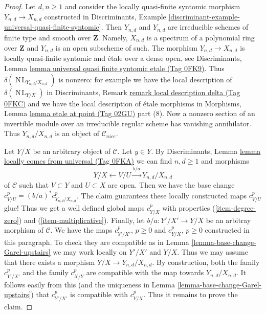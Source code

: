 \documentclass{amsart}
\theoremstyle{plain}
\theoremstyle{definition}
\theoremstyle{remark}
\numberwithin{equation}{subsection}
\def\NL{\mathop{N\!L}\nolimits}
\begin{document}
\begin{proof}
\medskip\noindent
Let $d, n \geq 1$ and consider the locally
quasi-finite syntomic morphism $Y_{n, d} \to X_{n, d}$
constructed in Discriminants, Example
\ref{discriminant-example-universal-quasi-finite-syntomic}.
Then $Y_{n, d}$ and $Y_{n, d}$ are irreducible schemes of finite type and
smooth over $\mathbf{Z}$. Namely, $X_{n, d}$ is a spectrum of a
polynomial ring over $\mathbf{Z}$ and $Y_{n, d}$ is an open subscheme
of such. The morphism $Y_{n, d} \to X_{n, d}$ is locally quasi-finite syntomic
and \'etale over a dense open, see Discriminants, Lemma
\href{https://stacks.math.columbia.edu/tag/0FK9}{lemma universal quasi finite syntomic etale (Tag 0FK9)}.
Thus $\delta(\NL_{Y_{n, d}/X_{n, d}})$ is nonzero: for example we have
the local description of $\delta(\NL_{Y/X})$ in
Discriminants, Remark \href{https://stacks.math.columbia.edu/tag/0FKC}{remark local description delta (Tag 0FKC)}
and we have the local description of \'etale morphisms in
Morphisms, Lemma \href{https://stacks.math.columbia.edu/tag/02GU}{lemma etale at point (Tag 02GU)} part (8).
Now a nonzero section of an invertible module over an irreducible
regular scheme has vanishing annihilator. Thus
$Y_{n, d}/X_{n, d}$ is an object of $\mathcal{C}_{nice}$.

\medskip\noindent
Let $Y/X$ be an arbitrary object of $\mathcal{C}$. Let $y \in Y$.
By Discriminants, Lemma \href{https://stacks.math.columbia.edu/tag/0FKA}{lemma locally comes from universal (Tag 0FKA)}
we can find $n, d \geq 1$ and morphisms
$$
Y/X \leftarrow V/U \xrightarrow{b/a} Y_{n, d}/X_{n, d}
$$
of $\mathcal{C}$ such that $V \subset Y$ and $U \subset X$ are open.
Then we have the base change $c^p_{V/U} = (b/a)^*c^p_{Y_{n, d}/X_{n, d}}$.
The claim guarantees these locally constructed maps $c^p_{V/U}$ glue!
Thus we get a well defined global maps $c^p_{Y/X}$ with properties
(\ref{item-degree-zero}) and (\ref{item-multiplicative}).
Finally, let $b/a : Y'/X' \to Y/X$ be an arbitray morphism of $\mathcal{C}$.
We have the maps $c^p_{Y'/X'}$, $p \geq 0$ and $c^p_{Y/X}$, $p \geq 0$
constructed in this paragraph. To check they are compatible as in
Lemma \ref{lemma-base-change-Garel-upstairs} we may work locally
on $Y'/X'$ and $Y/X$. Thus we may assume that there exists a morphism
$Y/X \to Y_{n, d}/X_{n, d}$. By construction, both the family
$c^p_{Y'/X'}$ and the family $c^p_{X/Y}$ are compatible with
the map towards $Y_{n, d}/X_{n, d}$. It follows easily from this
(and the uniqueness in Lemma \ref{lemma-base-change-Garel-upstairs})
that $c^p_{Y'/X'}$ is compatible with $c^p_{Y/X}$.
Thus it remains to prove the claim.


\end{proof}
\end{document}
